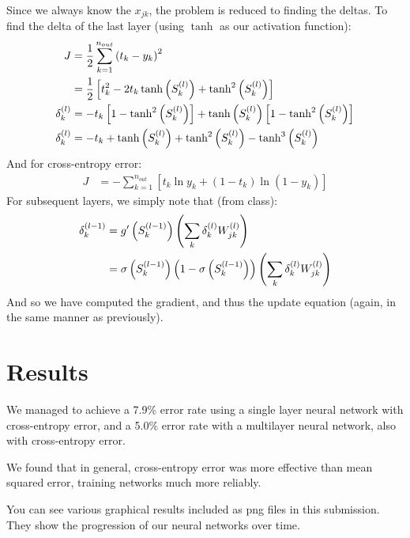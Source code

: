\documentclass[11pt]{article}
\begin{document}
Since we always know the $x_{jk}$, the problem is reduced to finding the deltas. To find the delta of the last layer (using $\tanh$ as our activation function):
\begin{align}
	J &= \frac{1}{2}\sum_{k=1}^{n_{out}}\left( t_k - y_k \right) ^2 \\
	&= \frac{1}{2}\left[ t_k^2 - 2t_k \tanh \left( S_k^{(l)} \right) + \tanh ^2 \left( S_k^{(l)} \right) \right] \\
	\delta_k^{(l)} &=  - t_k \left[ 1 - \tanh ^2 \left( S_k^{(l)} \right) \right] + \tanh \left( S_k^{(l)} \right) \left[ 1 - \tanh ^2 \left( S_k^{(l)} \right) \right] \\
	\delta_k^{(l)} &= -t_k + \tanh \left( S_k^{(l)} \right) + \tanh ^2 \left( S_k^{(l)} \right) - \tanh ^3 \left( S_k^{(l)} \right) 
\end{align}
And for cross-entropy error:
\begin{align}
	J &= - \sum_{k=1}^{n_{out}}\left[t_k \ln y_k + \left(1- t_k \right)\ln \left( 1- y_k \right) \right]
\end{align}
For subsequent layers, we simply note that (from class):
\begin{align*}
\delta_k^{(l-1)} &= g'\left( S_k^{(l-1)} \right) \left( \sum_k \delta_k^{(l)} W_{jk}^{(l)} \right) \\
&= \sigma \left( S_k^{(l-1)} \right) \left( 1 - \sigma \left( S_k^{(l-1)} \right) \right) \left( \sum_k \delta_k^{(l)} W_{jk}^{(l)} \right)
\end{align*}
And so we have computed the gradient, and thus the update equation (again, in the same manner as previously). 

\section{Results}
We managed to achieve a 7.9\% error rate using a single layer neural network with cross-entropy error, and a 5.0\% error rate with a multilayer neural network, also with cross-entropy error. 

We found that in general, cross-entropy error was more effective than mean squared error, training networks much more reliably. 

You can see various graphical results included as png files in this submission. They show the progression of our neural networks over time. 
\end{document}
